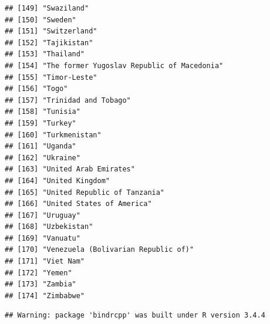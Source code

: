 \documentclass[]{article}
\begin{document}
\begin{verbatim}
## [149] "Swaziland"                                
## [150] "Sweden"                                   
## [151] "Switzerland"                              
## [152] "Tajikistan"                               
## [153] "Thailand"                                 
## [154] "The former Yugoslav Republic of Macedonia"
## [155] "Timor-Leste"                              
## [156] "Togo"                                     
## [157] "Trinidad and Tobago"                      
## [158] "Tunisia"                                  
## [159] "Turkey"                                   
## [160] "Turkmenistan"                             
## [161] "Uganda"                                   
## [162] "Ukraine"                                  
## [163] "United Arab Emirates"                     
## [164] "United Kingdom"                           
## [165] "United Republic of Tanzania"              
## [166] "United States of America"                 
## [167] "Uruguay"                                  
## [168] "Uzbekistan"                               
## [169] "Vanuatu"                                  
## [170] "Venezuela (Bolivarian Republic of)"       
## [171] "Viet Nam"                                 
## [172] "Yemen"                                    
## [173] "Zambia"                                   
## [174] "Zimbabwe"
\end{verbatim}

\begin{verbatim}
## Warning: package 'bindrcpp' was built under R version 3.4.4
\end{verbatim}
\end{document}
